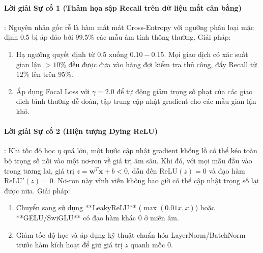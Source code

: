 \paragraph{Lời giải Sự cố 1 (Thảm họa sập Recall trên dữ liệu mất cân bằng)}:
Nguyên nhân gốc rễ là hàm mất mát Cross-Entropy với ngưỡng phân loại mặc định $0.5$ bị áp đảo bởi $99.5\%$ các mẫu âm tính thông thường.
Giải pháp:
\begin{enumerate}
  \item Hạ ngưỡng quyết định từ $0.5$ xuống $0.10 - 0.15$. Mọi giao dịch có xác suất gian lận $> 10\%$ đều được đưa vào hàng đợi kiểm tra thủ công, đẩy Recall từ $12\%$ lên trên $95\%$.
  \item Áp dụng Focal Loss với $\gamma = 2.0$ để tự động giảm trọng số phạt của các giao dịch bình thường dễ đoán, tập trung cập nhật gradient cho các mẫu gian lận khó.
\end{enumerate}

\paragraph{Lời giải Sự cố 2 (Hiện tượng Dying ReLU)}:
Khi tốc độ học $\eta$ quá lớn, một bước cập nhật gradient khổng lồ có thể kéo toàn bộ trọng số nối vào một nơ-ron về giá trị âm sâu. Khi đó, với mọi mẫu đầu vào trong tương lai, giá trị $z = \mathbf{w}^T \mathbf{x} + b < 0$, dẫn đến $\text{ReLU}(z) = 0$ và đạo hàm $\text{ReLU}'(z) = 0$. Nơ-ron này vĩnh viễn không bao giờ có thể cập nhật trọng số lại được nữa.
Giải pháp:
\begin{enumerate}
  \item Chuyển sang sử dụng **LeakyReLU** ($\max(0.01x, x)$) hoặc **GELU/SwiGLU** có đạo hàm khác 0 ở miền âm.
  \item Giảm tốc độ học và áp dụng kỹ thuật chuẩn hóa LayerNorm/BatchNorm trước hàm kích hoạt để giữ giá trị $z$ quanh mốc $0$.
\end{enumerate}
